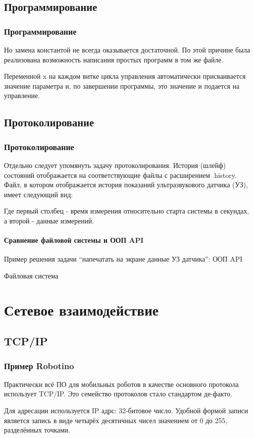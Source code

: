 \documentclass{beamer}
\begin{document}
\subsection{Программирование}
\begin{frame}
\frametitle{Программирование}
Но замена константой не всегда оказывается достаточной. По этой причине была
реализована возможность написания простых программ в том же файле.

Переменной x на каждом витке цикла управления автоматически присваивается
значение параметра и, по завершении программы, это значение и подается на
управление.
\end{frame}


\subsection{Протоколирование}
\begin{frame}
\frametitle{Протоколирование}
Отдельно следует упомянуть задачу протоколирования. История (шлейф) состояний
отображается на соответствующие файлы с расширением .history. Файл, в котором
отображается история показаний ультразвукового датчика (УЗ), имеет
следующий вид:

Где первый столбец - время измерения относительно старта системы в секундах, а
второй - данные измерений.
\end{frame}

\begin{frame}
\framesubtitle{Сравнение файловой системы и ООП API}
Пример решения задачи ``напечатать на экране данные УЗ датчика'':
ООП API

Файловая система

\end{frame}

\section{Сетевое взаимодействие}
\subsection{TCP/IP}
\begin{frame}
\frametitle{Пример Robotino}
Практически всё ПО для мобильных роботов в качестве основного протокола
использует TCP/IP. Это семейство протоколов стало стандартом де-факто.

Для адресации используется IP адрс: 32-битовое число. Удобной формой записи
является запись в виде четырёх десятичных чисел значением от 0 до 255,
разделённых точками.

\end{frame}
\end{document}
